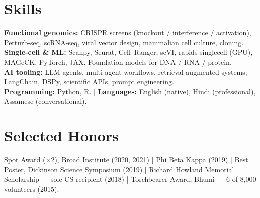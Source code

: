 \documentclass[letterpaper,10pt]{article}
\begin{document}
\section{Skills}
\small
\noindent
\textbf{Functional genomics:} CRISPR screens (knockout / interference / activation), Perturb-seq, scRNA-seq, viral vector design, mammalian cell culture, cloning. \\[2pt]
\textbf{Single-cell \& ML:} Scanpy, Seurat, Cell~Ranger, scVI, rapids-singlecell (GPU), MAGeCK, PyTorch, JAX. Foundation models for DNA / RNA / protein. \\[2pt]
\textbf{AI tooling:} LLM agents, multi-agent workflows, retrieval-augmented systems, LangChain, DSPy, scientific APIs, prompt engineering. \\[2pt]
\textbf{Programming:} Python, R. \;|\; \textbf{Languages:} English (native), Hindi (professional), Assamese (conversational).
\normalsize

\section{Selected Honors}
\small
\noindent
Spot Award ($\times$2), Broad Institute (2020, 2021) \;|\;
Phi Beta Kappa (2019) \;|\;
Best Poster, Dickinson Science Symposium (2019) \;|\;
Richard Howland Memorial Scholarship --- sole CS recipient (2018) \;|\;
Torchbearer Award, Bhumi --- 6 of 8{,}000 volunteers (2015).
\normalsize
\end{document}
